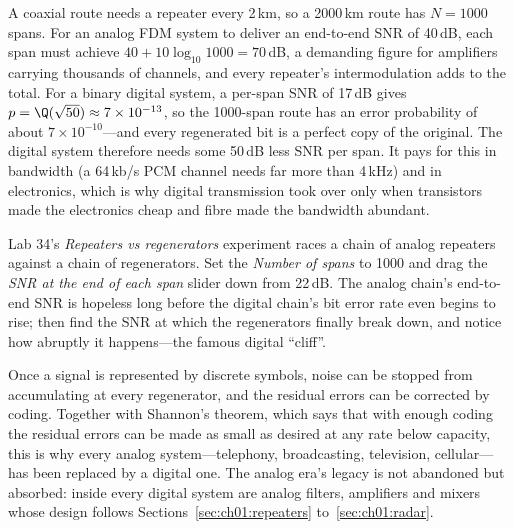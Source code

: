 \begin{worked}
A coaxial route needs a repeater every 2\,km, so a 2000\,km route has $N=1000$ spans. For an analog
FDM system to deliver an end-to-end SNR of 40\,dB, each span must achieve $40+10\log_{10}1000=70$\,dB,
a demanding figure for amplifiers carrying thousands of channels, and every repeater's
intermodulation adds to the total. For a binary digital system, a per-span SNR of 17\,dB gives
$p=\Q(\sqrt{50})\approx7\times10^{-13}$, so the 1000-span route has an error probability of about
$7\times10^{-10}$---and every regenerated bit is a perfect copy of the original. The digital system
therefore needs some 50\,dB less SNR per span. It pays for this in bandwidth (a 64\,kb/s PCM channel
needs far more than 4\,kHz) and in electronics, which is why digital transmission took over only when
transistors made the electronics cheap and fibre made the bandwidth abundant.
\end{worked}


\begin{tryit}
Lab 34's \emph{Repeaters vs regenerators} experiment races a chain of analog repeaters against a chain
of regenerators. Set the \emph{Number of spans} to 1000 and drag the \emph{SNR at the end of each span}
slider down from 22\,dB. The analog chain's
end-to-end SNR is hopeless long before the digital chain's bit error rate even begins to rise; then
find the SNR at which the regenerators finally break down, and notice how abruptly it happens---the
famous digital ``cliff''.
\end{tryit}

\begin{keyidea}
Once a signal is represented by discrete symbols, noise can be stopped from accumulating at every
regenerator, and the residual errors can be corrected by coding. Together with Shannon's theorem,
which says that with enough coding the residual errors can be made as small as desired at any rate
below capacity, this is why every analog system---telephony, broadcasting, television, cellular---has been
replaced by a digital one. The analog era's legacy is not abandoned but absorbed: inside every digital
system are analog filters, amplifiers and mixers whose design follows Sections~\ref{sec:ch01:repeaters}
to~\ref{sec:ch01:radar}.
\end{keyidea}

